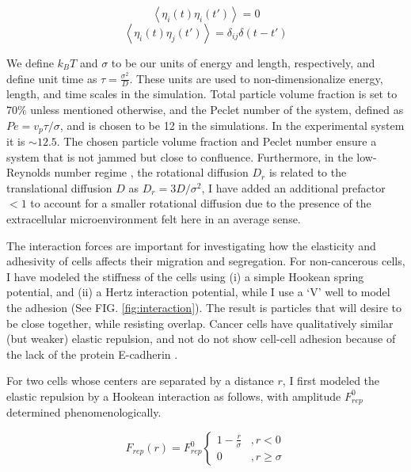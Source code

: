 \documentclass[aps,prb,twocolumn,groupedaddress,nofootinbib,floatfix]{revtex4}
\begin{document}
\begin{equation}
\left\langle \eta_i(t)\eta_i(t')\right\rangle = 0 
\end{equation}
\begin{equation}
\left\langle \eta_i(t)\eta_j(t')\right\rangle = \delta_{ij} \delta(t-t')
\end{equation}


We define $k_BT$ and $\sigma$ to be our units of energy and length, respectively, and define 
unit time as $\tau = \frac{\sigma^2}{D}$. These units are used to non-dimensionalize 
energy, length, and time scales in the simulation. Total particle volume fraction is set to $70\%$ unless mentioned otherwise, and 
the Peclet number of the system, defined as $Pe= v_p \tau/\sigma$, and is chosen to be 12 in the simulations.
In the experimental system it is  $\sim 12.5$. 
The chosen particle volume fraction and Peclet number ensure a system that is not jammed but close to confluence.
Furthermore, in the low-Reynolds number regime \cite{RednerHagan}, the rotational diffusion $D_r$ is related to the translational 
diffusion $D$ as $D_r= 3 D /\sigma^2$, I have added an additional prefactor $<1$ to account for a smaller
rotational diffusion due to the presence of the extracellular microenvironment felt here in an average sense.



The interaction forces are important for investigating how the elasticity and adhesivity of cells affects their migration and segregation. For non-cancerous cells, 
I have modeled the stiffness of the cells using (i) a simple Hookean spring potential, and (ii) a Hertz interaction potential, while I use a `V' well to model the adhesion (See FIG. \ref{fig:interaction}). 
The result is particles that will desire to be close together, while resisting overlap. Cancer cells have qualitatively similar (but weaker) elastic repulsion, and not do not show 
cell-cell adhesion because of the lack of the protein E-cadherin \cite{Jeanes}. 


For two cells whose centers are separated by a distance $r$, I first modeled the elastic repulsion by a  Hookean interaction as follows, with amplitude $F^0_{rep}$ determined phenomenologically.
 
\begin{equation}
  F_{rep}(r) = F^0_{rep} \left\{ 
    \begin{array}{lr}
      1-\frac{r}{\sigma} &, r < 0\\
      0 &, r \ge \sigma
    \end{array}
  \right.
  \label{eq:frep}
\end{equation}
\end{document}
